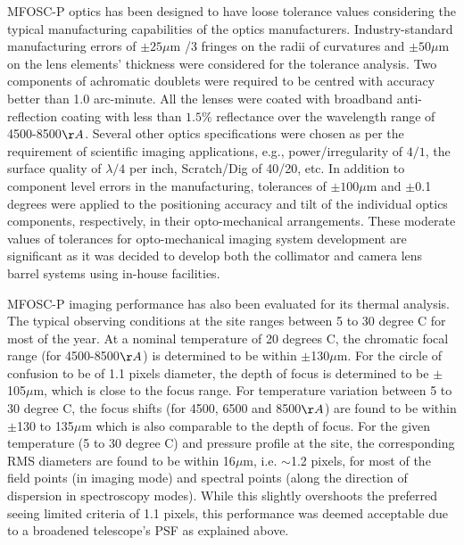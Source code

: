 MFOSC-P optics has been designed to have loose tolerance values considering the typical manufacturing capabilities of the optics manufacturers. Industry-standard manufacturing errors of $\pm25\mu$m /3 fringes on the radii of curvatures and $\pm50\mu$m on the lens elements' thickness were considered for the tolerance analysis. Two components of achromatic doublets were required to be centred with accuracy better than 1.0 arc-minute.  All the lenses were coated with broadband anti-reflection coating with less than $1.5\%$ reflectance over the wavelength range of 4500-8500$\AA$. Several other optics specifications were chosen as per the requirement of scientific imaging applications, e.g., power/irregularity of $4/1$, the surface quality of $\lambda/4$ per inch, Scratch/Dig of 40/20, etc. In addition to component level errors in the manufacturing, tolerances of $\pm100\mu$m and $\pm$0.1 degrees were applied to the positioning accuracy and tilt of the individual optics components, respectively, in their opto-mechanical arrangements. These moderate values of tolerances for opto-mechanical imaging system development are significant as it was decided to develop both the collimator and camera lens barrel systems using in-house facilities. 
\par 
MFOSC-P imaging performance has also been evaluated for its thermal analysis. The typical observing conditions at the site ranges between 5 to 30 degree C for most of the year. At a nominal temperature of 20 degrees C, the chromatic focal range (for 4500-8500$\AA$) is determined to be within $\pm$130$\mu$m. For the circle of confusion to be of 1.1 pixels diameter, the depth of focus is determined to be $\pm$105$\mu$m, which is close to the focus range. For temperature variation between 5 to 30 degree C, the focus shifts (for 4500, 6500 and 8500$\AA$) are found to be within $\pm$130 to 135$\mu$m which is also comparable to the depth of focus. For the given temperature (5 to 30 degree C) and pressure profile at the site, the corresponding RMS diameters are found to be within 16$\mu$m, i.e. $\sim$1.2 pixels, for most of the field points (in imaging mode) and spectral points (along the direction of dispersion in spectroscopy modes). While this slightly overshoots the preferred seeing limited criteria of 1.1 pixels, this performance was deemed acceptable due to a broadened telescope's PSF as explained above. 
\par 
